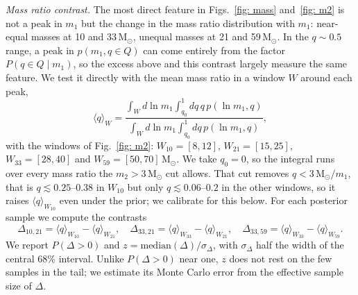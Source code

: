 \documentclass[%
 reprint,
 amsmath,amssymb,
 aps,
 prl,
 nofootinbib,nobibnotes,
 floatfix,
]{revtex4-2}
\newcommand{\Msun}{\ensuremath{\mathrm{M}_{\odot}}}
\newcommand{\featTen}{10\xspace}
\newcommand{\featTwenty}{21\xspace}
\newcommand{\featThirtyFive}{33\xspace}
\newcommand{\featSixty}{59\xspace}
\begin{document}
\textit{Mass ratio contrast.} The most direct feature in Figs.~\ref{fig: mass} and~\ref{fig: m2} is not a peak in $m_1$ but the change in the mass ratio distribution with $m_1$: near-equal masses at \featTen and \featThirtyFive\,\Msun, unequal masses at \featTwenty and \featSixty\,\Msun. In the $q \sim 0.5$ range, a peak in $p(m_1, q \in Q)$ can come entirely from the factor $P(q \in Q \mid m_1)$, so the excess above and this contrast largely measure the same feature. We test it directly with the mean mass ratio in a window $W$ around each peak,
\begin{equation}
    \langle q \rangle_W = \frac{\int_W d\ln m_1 \int_{q_0}^1 dq\, q\, p(\ln m_1, q)}{\int_W d\ln m_1 \int_{q_0}^1 dq\, p(\ln m_1, q)},
\end{equation}
with the windows of Fig.~\ref{fig: m2}: $W_{\featTen} = [8, 12]$, $W_{\featTwenty} = [15, 25]$, $W_{\featThirtyFive} = [28, 40]$ and $W_{\featSixty} = [50, 70]\,\Msun$. We take $q_0 = 0$, so the integral runs over every mass ratio the $m_2 > 3\,\Msun$ cut allows. That cut removes $q < 3\,\Msun/m_1$, that is $q \lesssim 0.25$--$0.38$ in $W_{\featTen}$ but only $q \lesssim 0.06$--$0.2$ in the other windows, so it raises $\langle q \rangle_{W_{\featTen}}$ even under the prior; we calibrate for this below. For each posterior sample we compute the contrasts
\begin{equation}
    \Delta_{\featTen,\featTwenty} = \langle q \rangle_{W_{\featTen}} - \langle q \rangle_{W_{\featTwenty}}, \quad
    \Delta_{\featThirtyFive,\featTwenty} = \langle q \rangle_{W_{\featThirtyFive}} - \langle q \rangle_{W_{\featTwenty}}, \quad
    \Delta_{\featThirtyFive,\featSixty} = \langle q \rangle_{W_{\featThirtyFive}} - \langle q \rangle_{W_{\featSixty}}.
\end{equation}
We report $P(\Delta > 0)$ and $z = \mathrm{median}(\Delta) / \sigma_\Delta$, with $\sigma_\Delta$ half the width of the central 68\% interval. Unlike $P(\Delta > 0)$ near one, $z$ does not rest on the few samples in the tail; we estimate its Monte Carlo error from the effective sample size of $\Delta$.
\end{document}
